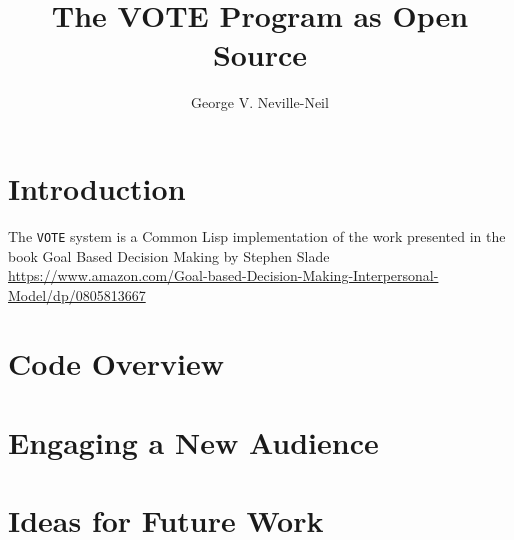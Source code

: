 \documentclass[10pt]{article}
\begin{document}

\title{The VOTE Program as Open Source}
\author{George V. Neville-Neil}
\maketitle
%
\section{Introduction}
\label{sec:intro}

The \verb|VOTE| system is a Common Lisp implementation of the work
presented in the book Goal Based Decision Making by Stephen Slade
\url{https://www.amazon.com/Goal-based-Decision-Making-Interpersonal-Model/dp/0805813667}

\section{Code Overview}
\label{sec:overview}

\section{Engaging a New Audience}
\label{sec:egnaging}

\section{Ideas for Future Work}
\label{sec:future}

\footnotesize{


}
\end{document}
